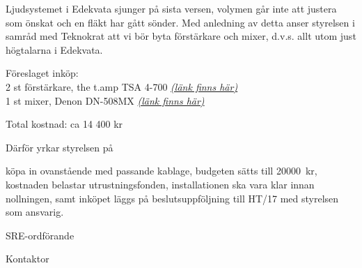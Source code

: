 \documentclass[../_main/handlingar.tex]{subfiles}
\begin{document}
Ljudsystemet i Edekvata sjunger på sista versen, volymen går inte att justera som önskat och en fläkt har gått sönder. Med anledning av detta anser styrelsen i samråd med Teknokrat att vi bör byta förstärkare och mixer, d.v.s. allt utom just högtalarna i Edekvata.

Föreslaget inköp:\\
2 st förstärkare, the t.amp TSA 4-700 \href{https://www.thomann.de/se/the_tamp_tsa_4700.htm}{\textit{(länk finns här)}}\\
1 st mixer, Denon DN-508MX \href{https://www.thomann.de/se/denon_dn_508mx.htm}{\textit{(länk finns här)}}

Total kostnad: ca 14 400 kr

Därför yrkar styrelsen på

\begin{attsatser}
    \att köpa in ovanstående med passande kablage,
    \att budgeten sätts till \SI{20000}{kr},
    \att kostnaden belastar utrustningsfonden,
    \att installationen ska vara klar innan nollningen, samt
    \att inköpet läggs på beslutsuppföljning till HT/17 med styrelsen som ansvarig.
\end{attsatser}

\begin{signatures}{2}
    \ist
    \signature{\sreordf}{SRE-ordförande}
    \signature{\sekr}{Kontaktor}
\end{signatures}
\end{document}
